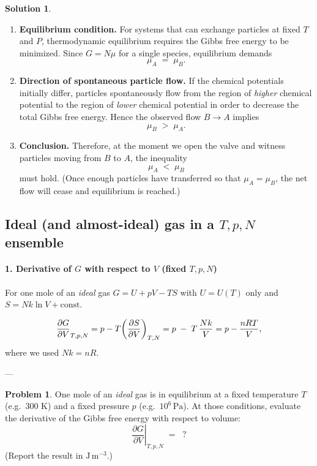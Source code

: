 \documentclass[12pt]{article}
\theoremstyle{definition} %
\newtheorem{solution}{Solution}
\newtheorem{problem}{Problem}
\theoremstyle{plain} %
\begin{document}
  \begin{solution}
  \begin{enumerate}
      \item \textbf{Equilibrium condition.}  
            For systems that can exchange particles at fixed $T$ and $P$, thermodynamic equilibrium requires the Gibbs free energy to be minimized.  
            Since $G = N\mu$ for a single species, equilibrium demands
            \[
                \mu_A \;=\; \mu_B.
            \]
      \item \textbf{Direction of spontaneous particle flow.}  
            If the chemical potentials initially differ, particles spontaneously flow from the region of \emph{higher} chemical potential to the region of \emph{lower} chemical potential in order to decrease the total Gibbs free energy.
            Hence the observed flow $B \to A$ implies
            \[
                \mu_B \;>\; \mu_A.
            \]
      \item \textbf{Conclusion.}  
            Therefore, at the moment we open the valve and witness particles moving from $B$ to $A$, the inequality
            \[
                \boxed{\mu_A \;<\; \mu_B}
            \]
            must hold.  
            (Once enough particles have transferred so that $\mu_A=\mu_B$, the net flow will cease and equilibrium is reached.)
  \end{enumerate}
  \end{solution}
\subsection*{Ideal (and almost-ideal) gas in a $T,p,N$ ensemble}

\paragraph{1.  Derivative of $G$ with respect to $V$ (fixed $T,p,N$)}

For one mole of an \emph{ideal} gas  
\(G = U + pV - TS\) with \(U=U(T)\) only and  
\(S = Nk\ln V + \text{const}\).

\[
  \pdv{G}{V}_{T,p,N}
  = p - T\!\left(\pdv{S}{V}\right)_{T,N}
  = p \;-\; T\,\frac{Nk}{V}
  = p - \frac{nRT}{V},
\]
where we used \(Nk = nR\).

---
\begin{problem}
  One mole of an \emph{ideal} gas is in equilibrium at a fixed temperature $T$ (e.g.\ 300 K) and a fixed pressure $p$ (e.g.\ $10^{6}\,\text{Pa}$).
  At those conditions, evaluate the derivative of the Gibbs free energy with respect to volume:
  \[
  \left.\frac{\partial G}{\partial V}\right|_{T,p,N}\;=\;\;?
  \]
  (Report the result in $\text{J}\,\text{m}^{-3}$.)
  \end{problem}
  
\end{document}
